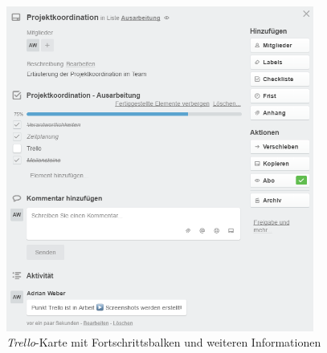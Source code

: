 \begin{figure}[hp] 
  \centering
     \includegraphics[width=0.9\textwidth]{images/KarteProjektkoordination.PNG}
  \caption{\textit{Trello}-Karte mit Fortschrittsbalken und weiteren Informationen}
  \label{fig:Trello-Karte mit Fortschrittsbalken, Kommentar und weiteren Informationen}
\end{figure}